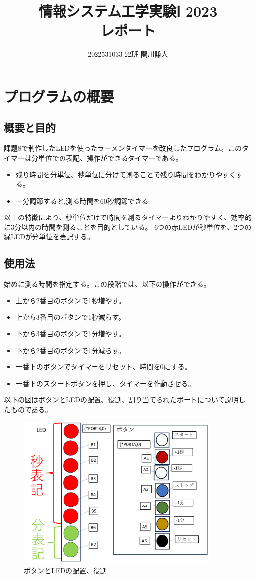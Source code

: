 \documentclass[a4paper,titlepage,11pt]{ltjsarticle}
\begin{document}
\title{情報システム工学実験Ⅰ 2023\\レポート}
\author{2022531033 22班 関川謙人}
\maketitle
\section{プログラムの概要}
\subsection{概要と目的}
課題8で制作したLEDを使ったラーメンタイマーを改良したプログラム。このタイマーは分単位での表記、操作ができるタイマーである。
\begin{itemize}
  \item 残り時間を分単位、秒単位に分けて測ることで残り時間をわかりやすくする。
  \item 一分調節すると,測る時間を60秒調節できる
\end{itemize}
以上の特徴により、秒単位だけで時間を測るタイマーよりわかりやすく、効率的に3分以内の時間を測ることを目的としている。
6つの赤LEDが秒単位を、2つの緑LEDが分単位を表記する。
\subsection{使用法}
始めに測る時間を指定する。この段階では、以下の操作ができる。
\begin{itemize}
  \item 上から2番目のボタンで1秒増やす。
  \item 上から3番目のボタンで1秒減らす。
  \item 下から3番目のボタンで1分増やす。
  \item 下から2番目のボタンで1分減らす。
  \item 一番下のボタンでタイマーをリセット、時間を0にする。
  \item 一番下のスタートボタンを押し、タイマーを作動させる。
\end{itemize}
以下の図はボタンとLEDの配置、役割、割り当てられたポートについて説明したものである。
\begin{figure}[H]
  \begin{center}
    \includegraphics[width=100mm]{breadboard.pdf}
    \caption{ボタンとLEDの配置、役割}
  \end{center}
  \end{figure}
\end{document}
